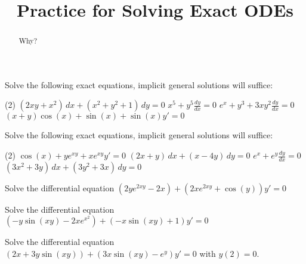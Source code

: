 \documentclass{ximera}
\title{Practice for Solving Exact ODEs}
\begin{document}
\begin{abstract}
    Why?
\end{abstract}
\maketitle

\begin{exercise}
    Solve the following exact equations, implicit general solutions will suffice:
    \begin{tasks}(2)
        \task $(2 xy + x^2) \, dx + (x^2+y^2+1) \, dy = 0$
        \task $x^5 + y^5 \frac{dy}{dx} = 0$
        \task $e^x+y^3 + 3xy^2 \frac{dy}{dx} = 0$
        \task $(x+y)\cos(x)+\sin(x) + \sin(x)y' = 0$
    \end{tasks}
\end{exercise}

\begin{exercise}%
    Solve the following exact equations, implicit general solutions will suffice:
    \begin{tasks}(2)
        \task $\cos(x)+ye^{xy} + xe^{xy} y' = 0$
        \task $(2x+y)\, dx + (x-4y) \, dy = 0$
        \task $e^x + e^y \frac{dy}{dx} = 0$
        \task $(3x^2+3y)\,dx + (3y^2+3x)\, dy = 0$
    \end{tasks}
\end{exercise}

\begin{exercise}
    Solve the differential equation $(2ye^{2xy} - 2x) + (2xe^{2xy} + \cos(y))y' = 0$
\end{exercise}

\begin{exercise}
    Solve the differential equation $(-y\sin(xy) - 2xe^{x^2}) + (-x\sin(xy) + 1)y' = 0$
\end{exercise}

\begin{exercise}
    Solve the differential equation $(2x + 3y\sin(xy)) + (3x\sin(xy) - e^y)y' = 0$ with $y(2) = 0$. 
\end{exercise}
\end{document}
